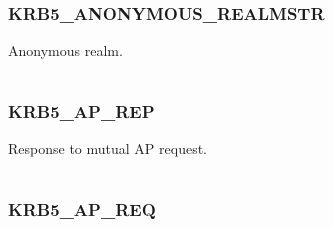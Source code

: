 \documentclass[letterpaper,10pt,english]{sphinxmanual}
\begin{document}
\subsubsection{KRB5\_ANONYMOUS\_REALMSTR}
\label{appdev/refs/macros/KRB5_ANONYMOUS_REALMSTR:krb5-anonymous-realmstr-data}\label{appdev/refs/macros/KRB5_ANONYMOUS_REALMSTR:krb5-anonymous-realmstr}\label{appdev/refs/macros/KRB5_ANONYMOUS_REALMSTR::doc}

\begin{fulllineitems}
\label{appdev/refs/macros/KRB5_ANONYMOUS_REALMSTR:KRB5_ANONYMOUS_REALMSTR}
\end{fulllineitems}


Anonymous realm.

\begin{tabulary}{\linewidth}{|L|L|}
\hline

 & 
\\\hline
\end{tabulary}



\subsubsection{KRB5\_AP\_REP}
\label{appdev/refs/macros/KRB5_AP_REP:krb5-ap-rep}\label{appdev/refs/macros/KRB5_AP_REP::doc}\label{appdev/refs/macros/KRB5_AP_REP:krb5-ap-rep-data}

\begin{fulllineitems}
\label{appdev/refs/macros/KRB5_AP_REP:KRB5_AP_REP}
\end{fulllineitems}


Response to mutual AP request.

\begin{tabulary}{\linewidth}{|L|L|}
\hline

 & 
\\\hline
\end{tabulary}



\subsubsection{KRB5\_AP\_REQ}
\label{appdev/refs/macros/KRB5_AP_REQ:krb5-ap-req}\label{appdev/refs/macros/KRB5_AP_REQ::doc}\label{appdev/refs/macros/KRB5_AP_REQ:krb5-ap-req-data}
\end{document}
